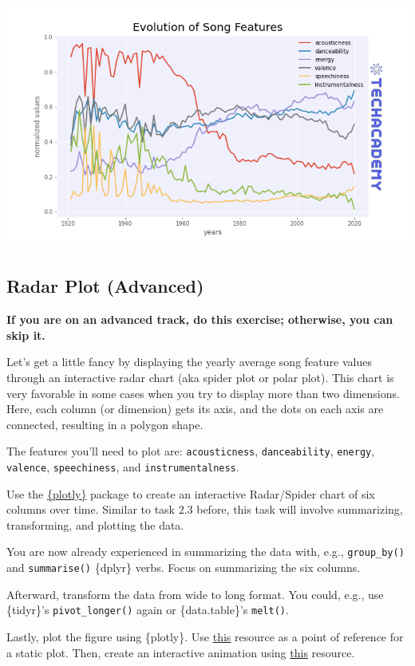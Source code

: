 \documentclass[
  11pt,
]{book}
\newenvironment{tips}[1]
  {
  \begin{itemize}
  \footnotesize
  \renewcommand{\labelitemi}{
    \raisebox{-.7\height}[0pt][0pt]{
      {\setkeys{Gin}{width=3em,keepaspectratio}
        \texttt{[image: images/\#1.png]}}
    }
  }
  \setlength{\fboxsep}{1em}
  \begin{rbox}
  \item
  }
  {
  \end{rbox}
  \end{itemize}
  }
\begin{document}
\begin{center}\includegraphics[width=1\linewidth]{splots/features_over_time} \end{center}

\hypertarget{radar-plot-advanced}{%
\subsection{Radar Plot (Advanced)}\label{radar-plot-advanced}}

\textbf{If you are on an advanced track, do this exercise; otherwise, you can skip it.}

Let's get a little fancy by displaying the yearly average song feature values through an interactive radar chart (aka spider plot or polar plot). This chart is very favorable in some cases when you try to display more than two dimensions. Here, each column (or dimension) gets its axis, and the dots on each axis are connected, resulting in a polygon shape.

The features you'll need to plot are: \texttt{acousticness}, \texttt{danceability}, \texttt{energy}, \texttt{valence}, \texttt{speechiness}, and \texttt{instrumentalness}.

\begin{tips}r

Use the \href{https://plotly.com/r/getting-started/}{\{plotly\}} package to create an interactive Radar/Spider chart of six columns over time. Similar to task 2.3 before, this task will involve summarizing, transforming, and plotting the data.

You are now already experienced in summarizing the data with, e.g., \texttt{group\_by()} and \texttt{summarise()} \{dplyr\} verbs. Focus on summarizing the six columns.

Afterward, transform the data from wide to long format. You could, e.g., use \{tidyr\}'s \texttt{pivot\_longer()} again or \{data.table\}'s \texttt{melt()}.

Lastly, plot the figure using \{plotly\}. Use \href{https://plotly.com/r/radar-chart/}{this} resource as a point of reference for a static plot. Then, create an interactive animation using \href{https://plotly.com/r/animations/}{this} resource.

\end{tips}
\end{document}
